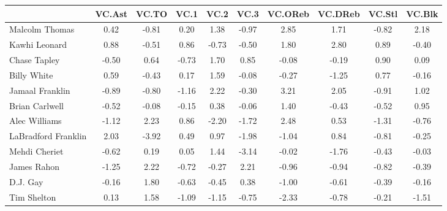 \documentclass[10pt,letterpaper]{article}
\begin{document}
\begin{table}[ht]
\begin{center}
\begin{tabular}{lccccccccc}
  \hline
 & VC.Ast & VC.TO & VC.1 & VC.2 & VC.3 & VC.OReb & VC.DReb & VC.Stl & VC.Blk \\ 
  \hline
Malcolm Thomas & 0.42 & -0.81 & 0.20 & 1.38 & -0.97 & 2.85 & 1.71 & -0.82 & 2.18 \\ 
  Kawhi Leonard & 0.88 & -0.51 & 0.86 & -0.73 & -0.50 & 1.80 & 2.80 & 0.89 & -0.40 \\ 
  Chase Tapley & -0.50 & 0.64 & -0.73 & 1.70 & 0.85 & -0.08 & -0.19 & 0.90 & 0.09 \\ 
  Billy White & 0.59 & -0.43 & 0.17 & 1.59 & -0.08 & -0.27 & -1.25 & 0.77 & -0.16 \\ 
  Jamaal Franklin & -0.89 & -0.80 & -1.16 & 2.22 & -0.30 & 3.21 & 2.05 & -0.91 & 1.02 \\ 
  Brian Carlwell & -0.52 & -0.08 & -0.15 & 0.38 & -0.06 & 1.40 & -0.43 & -0.52 & 0.95 \\ 
  Alec Williams & -1.12 & 2.23 & 0.86 & -2.20 & -1.72 & 2.48 & 0.53 & -1.31 & -0.76 \\ 
  LaBradford Franklin & 2.03 & -3.92 & 0.49 & 0.97 & -1.98 & -1.04 & 0.84 & -0.81 & -0.25 \\ 
  Mehdi Cheriet & -0.62 & 0.19 & 0.05 & 1.44 & -3.14 & -0.02 & -1.76 & -0.43 & -0.03 \\ 
  James Rahon & -1.25 & 2.22 & -0.72 & -0.27 & 2.21 & -0.96 & -0.94 & -0.82 & -0.39 \\ 
  D.J. Gay & -0.16 & 1.80 & -0.63 & -0.45 & 0.38 & -1.00 & -0.61 & -0.39 & -0.16 \\ 
  Tim Shelton & 0.13 & 1.58 & -1.09 & -1.15 & -0.75 & -2.33 & -0.78 & -0.21 & -1.51 \\ 
   \hline
\end{tabular}
\end{center}
\end{table}
\end{document}
